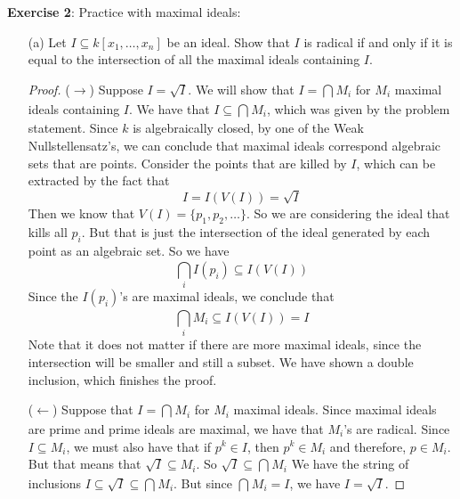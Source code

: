 \documentclass{article}
\begin{document}
\textbf{Exercise 2}: Practice with maximal ideals:
    \begin{itemize}
        \item [(a)] Let $I \subseteq k[x_{1}, \ldots, x_{n}]$ be an ideal. Show that $I$ is radical if and only if it is equal to the intersection of all the maximal ideals containing $I$.
            \begin{proof}
                ($\rightarrow $) Suppose $I = \sqrt{I}$. We will show that $I = \bigcap_{}^{} M_{i}$ for $M_{i}$ maximal ideals containing $I$. We have that $I \subseteq \bigcap_{}^{} M_{i}$, which was given by the problem statement. Since $k$ is algebraically closed, by one of the Weak Nullstellensatz's, we can conclude that maximal ideals correspond algebraic sets that are points. Consider the points that are killed by $I$, which can be extracted by the fact that
                    \begin{equation*}
                        I = I(V(I)) = \sqrt{I}
                    \end{equation*}
                Then we know that $V(I) = \{p_{1}, p_{2}, \ldots \}$. So we are considering the ideal that kills all $p_{i}$. But that is just the intersection of the ideal generated by each point as an algebraic set. So we have
                    \begin{equation*}
                        \bigcap_{i}^{} I(p_{i}) \subseteq I(V(I))
                    \end{equation*}
                Since the $I(p_{i})$'s are maximal ideals, we conclude that
                    \begin{equation*}
                        \bigcap_{i}^{} M_{i} \subseteq I(V(I)) = I
                    \end{equation*}
                Note that it does not matter if there are more maximal ideals, since the intersection will be smaller and still a subset. We have shown a double inclusion, which finishes the proof.

                ($\leftarrow $) Suppose that $I = \bigcap_{}^{} M_{i}$ for $M_{i}$ maximal ideals. Since maximal ideals are prime and prime ideals are maximal, we have that $M_{i}$'s are radical. Since $I \subseteq M_{i}$, we must also have that if $p^{k} \in I$, then $p^{k} \in M_{i}$ and therefore, $p \in M_{i}$. But that means that $\sqrt{I} \subseteq M_{i}$. So $\sqrt{I} \subseteq \bigcap_{}^{} M_{i}$ We have the string of inclusions $I \subseteq \sqrt{I} \subseteq \bigcap_{}^{} M_{i}$. But since $\bigcap_{}^{} M_{i} = I$, we have $I = \sqrt{I}$.
            \end{proof}


\end{itemize}
\end{document}
